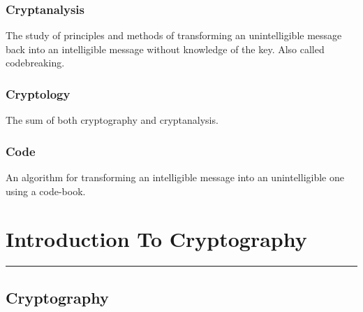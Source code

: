 \documentclass[10pt,british]{article}
\begin{document}
\subsubsection{Cryptanalysis}

The study of principles and methods of transforming an unintelligible
message back into an intelligible message without knowledge of the
key. Also called codebreaking.

\subsubsection{Cryptology}

The sum of both cryptography and cryptanalysis.

\subsubsection{Code}

An algorithm for transforming an intelligible message into an unintelligible
one using a code-book.

\pagebreak{}

\section{Introduction To Cryptography}
\begin{center}
\rule[0.5ex]{450bp}{0.75pt}
\par\end{center}

\subsection{Cryptography}
\end{document}
